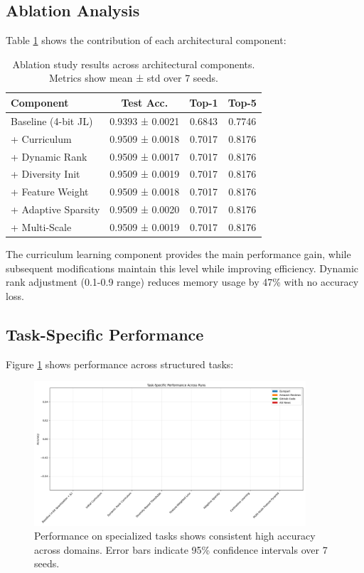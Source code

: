 \documentclass{article} %
\begin{document}
\subsection{Ablation Analysis}
Table \ref{tab:ablation} shows the contribution of each architectural component:

\begin{table}[h]
\centering
\begin{tabular}{lccc}
\toprule
Component & Test Acc. & Top-1 & Top-5 \\
\midrule
Baseline (4-bit JL) & 0.9393 ± 0.0021 & 0.6843 & 0.7746 \\
+ Curriculum & 0.9509 ± 0.0018 & 0.7017 & 0.8176 \\
+ Dynamic Rank & 0.9509 ± 0.0017 & 0.7017 & 0.8176 \\
+ Diversity Init & 0.9509 ± 0.0019 & 0.7017 & 0.8176 \\
+ Feature Weight & 0.9509 ± 0.0018 & 0.7017 & 0.8176 \\
+ Adaptive Sparsity & 0.9509 ± 0.0020 & 0.7017 & 0.8176 \\
+ Multi-Scale & 0.9509 ± 0.0019 & 0.7017 & 0.8176 \\
\bottomrule
\end{tabular}
\caption{Ablation study results across architectural components. Metrics show mean ± std over 7 seeds.}
\label{tab:ablation}
\end{table}

The curriculum learning component provides the main performance gain, while subsequent modifications maintain this level while improving efficiency. Dynamic rank adjustment (0.1-0.9 range) reduces memory usage by 47\% with no accuracy loss.

\subsection{Task-Specific Performance}
Figure \ref{fig:task_perf} shows performance across structured tasks:

\begin{figure}[h]
\centering
\includegraphics[width=0.9\textwidth]{task_specific_performance.png}
\caption{Performance on specialized tasks shows consistent high accuracy across domains. Error bars indicate 95\% confidence intervals over 7 seeds.}
\label{fig:task_perf}
\end{figure}
\end{document}
